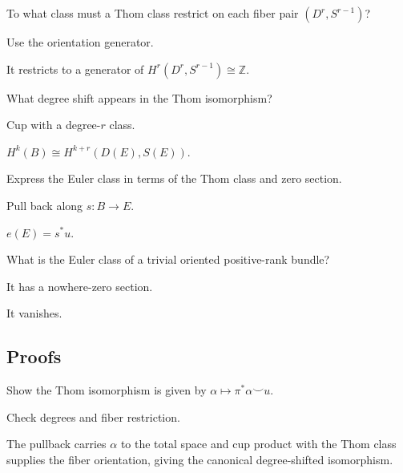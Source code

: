 \begin{exercise}\label{exr:viii31-ped-02}
To what class must a Thom class restrict on each fiber pair $(D^r,S^{r-1})$?
\end{exercise}
\begin{hint}
Use the orientation generator.
\end{hint}
\begin{solution}
It restricts to a generator of $H^r(D^r,S^{r-1})\cong\mathbb Z$.
\end{solution}

\begin{exercise}\label{exr:viii31-ped-03}
What degree shift appears in the Thom isomorphism?
\end{exercise}
\begin{hint}
Cup with a degree-$r$ class.
\end{hint}
\begin{solution}
$H^k(B)\cong H^{k+r}(D(E),S(E))$.
\end{solution}

\begin{exercise}\label{exr:viii31-ped-04}
Express the Euler class in terms of the Thom class and zero section.
\end{exercise}
\begin{hint}
Pull back along $s:B\to E$.
\end{hint}
\begin{solution}
$e(E)=s^*u$.
\end{solution}

\begin{exercise}\label{exr:viii31-ped-05}
What is the Euler class of a trivial oriented positive-rank bundle?
\end{exercise}
\begin{hint}
It has a nowhere-zero section.
\end{hint}
\begin{solution}
It vanishes.
\end{solution}

\subsection*{Proofs}

\begin{exercise}\label{exr:viii31-ped-06}
Show the Thom isomorphism is given by $\alpha\mapsto\pi^*\alpha\smile u$.
\end{exercise}
\begin{hint}
Check degrees and fiber restriction.
\end{hint}
\begin{solution}
The pullback carries $\alpha$ to the total space and cup product with the Thom class supplies the fiber orientation, giving the canonical degree-shifted isomorphism.
\end{solution}


